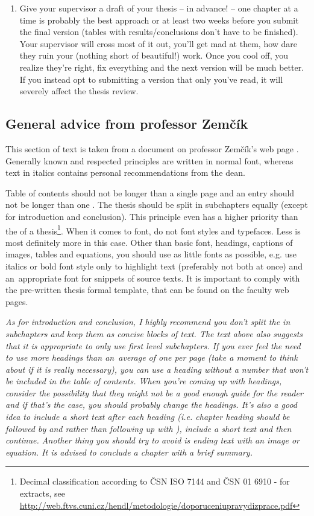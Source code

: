 \begin{enumerate}
  \item{Give your supervisor a draft of your thesis -- in advance! -- one chapter at a time is probably the best approach or at least two weeks before you submit the final version (tables with results/conclusions don't have to be finished). Your supervisor will cross most of it out, you'll get mad at them, how dare they ruin your (nothing short of beautiful!) work. Once you cool off, you realize they're right, fix everything and the next version will be much better. If you instead opt to submitting a version that only you've read, it will severely affect the thesis review.}
\end{enumerate}

\subsection{General advice from professor Zemčík}
This section of text is taken from a document on professor Zemčík's web page \cite{Zemcik}. Generally known and respected principles are written in normal font, whereas text in italics contains  personal recommendations from the dean.

Table of contents should not be longer than a single page and an entry should not be longer than one . The thesis should be split in subchapters equally (except for introduction and conclusion). This principle even has a higher priority than the  of a thesis\footnote{Decimal classification according to ČSN ISO 7144 and ČSN 01 6910 - for extracts, see \url{http://web.ftvs.cuni.cz/hendl/metodologie/doporuceniupravydizprace.pdf}}. When it comes to font, do not  font styles and typefaces. Less is most definitely more in this case. Other than basic font, headings, captions of images, tables and equations, you should use as little fonts as possible, e.g. use italics or bold font style only to highlight text (preferably not both at once) and an~appropriate  font for snippets of source texts. It is important to comply with the pre-written thesis formal template, that can be found on the faculty web pages.

\it As for introduction and conclusion, I highly recommend you don't split the in subchapters and keep them as concise blocks of text. The text above also suggests that it is appropriate to only use first level subchapters. If you ever feel the need to use more headings than an~average of one per page (take a moment to think about if it is really necessary), you can use a  heading without a number that won't be included in the table of contents. When you're coming up with headings, consider the possibility that they might not be a good enough guide for the reader and if that's the case, you should probably change the headings. It's also a good idea to include a short text after each heading (i.e. chapter heading should be followed by  and rather than following up with ), include a short text and then continue. Another thing you should try to avoid is ending text with an image or equation. It is advised to conclude a chapter with a brief summary.

